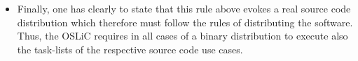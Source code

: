 \begin{itemize}
  \item Finally, one has clearly to state that this rule above evokes a real
  source code distribution which therefore must follow the rules of distributing
  the software. Thus, the OSLiC requires in all cases of a binary distribution
  to execute also the task-lists of the respective source code use cases.
 
  
  

  

\end{itemize}








%
